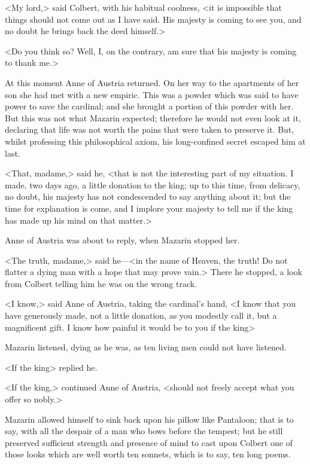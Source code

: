<My lord,> said Colbert, with his habitual coolness, <it is impossible that things should not come out as I have said. His majesty is coming to see you, and no doubt he brings back the deed himself.>

<Do you think so? Well, I, on the contrary, am sure that his majesty is coming to thank me.>

At this moment Anne of Austria returned. On her way to the apartments of her son she had met with a new empiric. This was a powder which was said to have power to save the cardinal; and she brought a portion of this powder with her. But this was not what Mazarin expected; therefore he would not even look at it, declaring that life was not worth the pains that were taken to preserve it. But, whilst professing this philosophical axiom, his long-confined secret escaped him at last.

<That, madame,> said he, <that is not the interesting part of my situation. I made, two days ago, a little donation to the king; up to this time, from delicacy, no doubt, his majesty has not condescended to say anything about it; but the time for explanation is come, and I implore your majesty to tell me if the king has made up his mind on that matter.>

Anne of Austria was about to reply, when Mazarin stopped her.

<The truth, madame,> said he—<in the name of Heaven, the truth! Do not flatter a dying man with a hope that may prove vain.> There he stopped, a look from Colbert telling him he was on the wrong track.

<I know,> said Anne of Austria, taking the cardinal's hand, <I know that you have generously made, not a little donation, as you modestly call it, but a magnificent gift. I know how painful it would be to you if the king\longdash>

Mazarin listened, dying as he was, as ten living men could not have listened.

<If the king\longdash> replied he.

<If the king,> continued Anne of Austria, <should not freely accept what you offer so nobly.>

Mazarin allowed himself to sink back upon his pillow like Pantaloon; that is to say, with all the despair of a man who bows before the tempest; but he still preserved sufficient strength and presence of mind to cast upon Colbert one of those looks which are well worth ten sonnets, which is to say, ten long poems.

